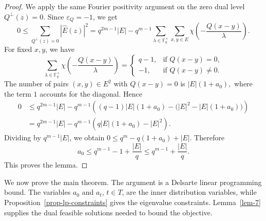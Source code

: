 \documentclass[11pt]{article}
\newcommand{\F}{\mathbb{F}}
\newcommand{\1}{\mathbf{1}}
\begin{document}
\begin{proof}
	We apply the same Fourier positivity argument on the zero dual level
	\(Q^\perp(z)=0\). Since \(\varepsilon_Q=-1\), we get
	\[0
	\le
	\sum_{Q^\perp(z)=0}|\widehat{E}(z)|^2 
	=
	q^{2m-1}|E|
	-
	q^{m-1}
	\sum_{\lambda\in\F_q^\times}
	\sum_{x,y\in E}
	\chi\left(-\frac{Q(x-y)}{\lambda}\right).\]
	For fixed \(x,y\), we have
	\[
	\sum_{\lambda\in\F_q^\times}
	\chi\left(-\frac{Q(x-y)}{\lambda}\right)
	=
	\begin{cases}
		q-1, & \text{if } Q(x-y)=0,\\
		-1, & \text{if } Q(x-y)\ne0.
	\end{cases}
	\]
	The number of pairs \((x,y)\in E^2\) with \(Q(x-y)=0\) is $|E|(1+a_0),$
	where the term \(1\) accounts for the diagonal. Hence
	\begin{align*}
		0
		&\le
		q^{2m-1}|E|
		-
		q^{m-1}
		\left(
		(q-1)|E|(1+a_0)
		-
		\bigl(|E|^2-|E|(1+a_0)\bigr)
		\right) \\
		&=
		q^{2m-1}|E|
		-
		q^{m-1}
		\left(
		q|E|(1+a_0)-|E|^2
		\right).
	\end{align*}
	Dividing by \(q^{m-1}|E|\), we obtain $0\le q^m-q(1+a_0)+|E|.$
	Therefore
	\[
	a_0\le q^{m-1}-1+\frac{|E|}{q}
	\le q^{m-1}+\frac{|E|}{q}.
	\]
	This proves the lemma.
\end{proof}

We now prove the main theorem. The argument is a Delsarte linear programming
bound. The variables \(a_0\) and \(a_t\), \(t\in T\), are the inner
distribution variables, while Proposition~\ref{prop-lp-constraints} gives
the eigenvalue constraints. Lemma~\ref{lem-7} supplies the dual feasible
solutions needed to bound the objective.
\end{document}
